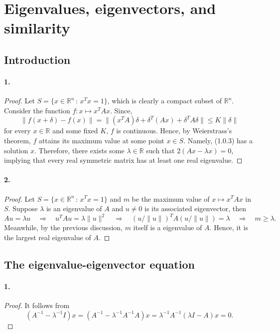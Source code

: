 \section{Eigenvalues, eigenvectors, and similarity}
\setcounter{subsection}{-1}

\subsection{Introduction}

  \paragraph{1.}
  \begin{proof}
    Let $S=\{x\in\mathbb{R}^n\,:\,x^Tx=1\}$, which is clearly a compact subset
    of $\mathbb{R}^n$. Consider the function $f:x\mapsto x^TAx$. Since,
    \[
      \|f(x+\delta)-f(x)\| = \|(x^TA)\delta + \delta^T(Ax) + \delta^TA\delta\|
      \le K\|\delta\|
    \]
    for every $x\in\mathbb{R}$ and some fixed $K$, $f$ is continuous. Hence,
    by Weierstrass's theorem, $f$ attains its maximum value at some point $x\in 
    S$. Namely, (1.0.3) has a solution $x$. Therefore, there exists some 
    $\lambda\in\mathbb{R}$ such that $2(Ax-\lambda x)=0$, implying that every
    real symmetric matrix has at least one real eigenvalue.
  \end{proof}

  \paragraph{2.}
  \begin{proof}
    Let $S=\{x\in\mathbb{R}^n\,:\,x^Tx=1\}$ and $m$ be the maximum value of $x
    \mapsto x^TAx$ in $S$. Suppose $\lambda$ is an eigenvalue of $A$ and $u\ne0$ 
    is its associated eigenvector, then
    \[
      Au=\lambda u \quad\Rightarrow\quad 
      u^TAu=\lambda\|u\|^2 \quad\Rightarrow\quad
      (u/\|u\|)^T A (u/\|u\|) = \lambda \quad\Rightarrow\quad
      m \ge \lambda.
    \]
    Meanwhile, by the previous discussion, $m$ itself is a eigenvalue of $A$.
    Hence, it is the largest real eigenvalue of $A$.
  \end{proof}


\subsection{The eigenvalue-eigenvector equation}
  \paragraph{1.}
  \begin{proof}
    It follows from
    \[
      (A^{-1}-\lambda^{-1}I)x 
      = (A^{-1}-\lambda^{-1}A^{-1}A)x 
      = \lambda^{-1}A^{-1}(\lambda I-A)x = 0.
    \]
  \end{proof}

